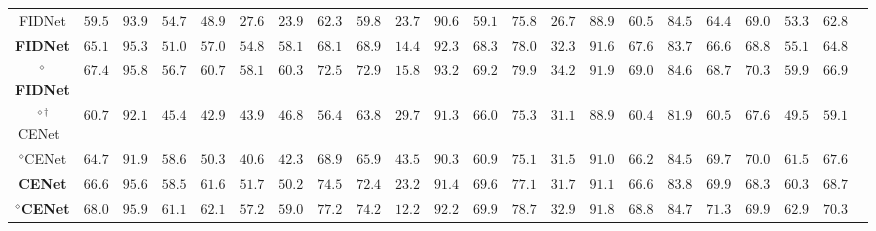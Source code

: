 \begin{table*}[t]
{\begin{tabular}{c|c|cccccccccccccccccccc}
FIDNet &  $59.5$ & $93.9$ & \underline{$54.7$} & $48.9$ & $27.6$ & $23.9$ & $62.3$ & $59.8$ & $\mathbf{23.7}$ & $90.6$ & $59.1$ & $75.8$ & $26.7$ & $88.9$ & $60.5$ & \underline{$84.5$} & $64.4$ & \underline{$69.0$} & $53.3$ & $62.8$
\\
\textcolor{orange}{\text{\faBolt}}\textbf{FIDNet}\textcolor{orange}{\text{\faBolt}}  &  \underline{$65.1$} &    \underline{$95.3$} &   $51.0$ &   \underline{$57.0$} &     \underline{$54.8$} &   \underline{$58.1$} &   \underline{$68.1$} &   \underline{$68.9$} &   $14.4$ &   \underline{$92.3$} &   \underline{$68.3$} &   \underline{$78.0$} &   \underline{$32.3$} &   \underline{$91.6$} &   \underline{$67.6$} &   $83.7$ &   \underline{$66.6$} &   $68.8$ &   \underline{$55.1$} &   \underline{$64.8$}
\\
$^\diamond$\textcolor{orange}{\text{\faBolt}}\textbf{FIDNet}\textcolor{orange}{\text{\faBolt}}  &  $\mathbf{67.4}$ &    $\mathbf{95.8}$ &   $\mathbf{56.7}$ &   $\mathbf{60.7}$ &     $\mathbf{58.1}$ &   $\mathbf{60.3}$ &   $\mathbf{72.5}$ &   $\mathbf{72.9}$ &   $15.8$ &   $\mathbf{93.2}$ &   $\mathbf{69.2}$ &   $\mathbf{79.9}$ &   $\mathbf{34.2}$ &   $\mathbf{91.9}$ &   $\mathbf{69.0}$ &   $\mathbf{84.6}$ &   $\mathbf{68.7}$ &   $\mathbf{70.3}$ &   $\mathbf{59.9}$ &   $\mathbf{66.9}$
\\
\arrayrulecolor[rgb]{0.4,0.4,0.4} \hline
$^{\diamond\dagger}$CENet~\cite{cheng2022cenet}  &  $60.7$ & $92.1$ & $45.4$ & $42.9$ & $43.9$ & $46.8$ & $56.4$ & $63.8$ & \underline{$29.7$} & $91.3$ & $66.0$ & $75.3$ & $31.1$ & $88.9$ & $60.4$ & $81.9$ & $60.5$ & $67.6$ & $49.5$ & $59.1$
\\
$^\diamond$CENet  & $64.7$ & $91.9$ &   \underline{$58.6$} & $50.3$ & $40.6$ & $42.3$ &   {$68.9$} & $65.9$ & $\mathbf{43.5}$ & $90.3$ & $60.9$ & $75.1$ & $31.5$ & $91.0$ & $66.2$ & \underline{$84.5$} & $69.7$ & $\mathbf{70.0}$ &   \underline{$61.5$} &   $67.6$
\\
\textcolor{orange}{\text{\faBolt}}\textbf{CENet}\textcolor{orange}{\text{\faBolt}}  &    \underline{$66.6$} &     \underline{$95.6$} &     $58.5$ &     \underline{$61.6$} &   \underline{$51.7$} &     \underline{$50.2$} &     \underline{$74.5$} &     \underline{$72.4$} &     $23.2$ &   \underline{$91.4$} &     \underline{$69.6$} &     \underline{$77.1$} &   \underline{$31.7$} &     \underline{$91.1$} &     \underline{$66.6$} &     $83.8$ &     \underline{$69.9$} &     $68.3$ &     $60.3$ &   \underline{$68.7$}
\\
$^\diamond$\textcolor{orange}{\text{\faBolt}}\textbf{CENet}\textcolor{orange}{\text{\faBolt}}  &    $\mathbf{68.0}$ &     $\mathbf{95.9}$ &     $\mathbf{61.1}$ &     $\mathbf{62.1}$ &   $\mathbf{57.2}$ &     $\mathbf{59.0}$ &     $\mathbf{77.2}$ &     $\mathbf{74.2}$ &     $12.2$ &   $\mathbf{92.2}$ &     $\mathbf{69.9}$ &     $\mathbf{78.7}$ &   $\mathbf{32.9}$ &     $\mathbf{91.8}$ &     $\mathbf{68.8}$ &     $\mathbf{84.7}$ &     $\mathbf{71.3}$ &     \underline{$69.9$} &     $\mathbf{62.9}$ &   $\mathbf{70.3}$

\end{tabular}}
\end{table*}
